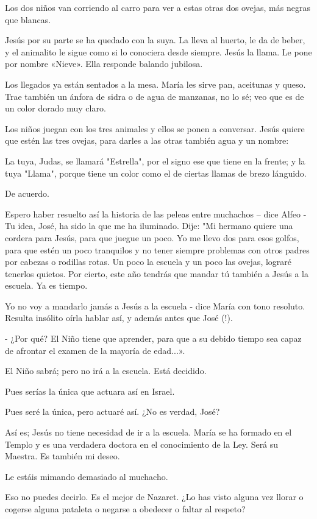 \documentclass[12pt]{book} %
\begin{document}
Los dos niños van corriendo al carro para ver a estas otras dos ovejas, más negras que blancas. 

Jesús por su parte se ha quedado con la suya. La lleva al huerto, le da de beber, y el animalito le sigue como si lo conociera desde siempre. Jesús la llama. Le pone por nombre «Nieve». Ella responde balando jubilosa. 

Los llegados ya están sentados a la mesa. María les sirve pan, aceitunas y queso. Trae también un ánfora de sidra o de agua de manzanas, no lo sé; veo que es de un color dorado muy claro. 

Los niños juegan con los tres animales y ellos se ponen a conversar. Jesús quiere que estén las tres ovejas, para darles a las otras también agua y un nombre: 

La tuya, Judas, se llamará "Estrella", por el signo ese que tiene en la frente; y la tuya "Llama", porque tiene un color como el de ciertas llamas de brezo lánguido. 

De acuerdo. 

Espero haber resuelto así la historia de las peleas entre muchachos – dice Alfeo - Tu idea, José, ha sido la que me ha iluminado. Dije: "Mi hermano quiere una cordera para Jesús, para que juegue un poco. Yo me llevo dos para esos golfos, para que estén un poco tranquilos y no tener siempre problemas con otros padres por cabezas o rodillas rotas. Un poco la escuela y un poco las ovejas, lograré tenerlos quietos. Por cierto, este año tendrás que mandar tú también a Jesús a la escuela. Ya es tiempo. 

Yo no voy a mandarlo jamás a Jesús a la escuela - dice María con tono resoluto. Resulta insólito oírla hablar así, y además antes que José (!). 

- ¿Por qué? El Niño tiene que aprender, para que a su debido tiempo sea capaz de afrontar el examen de la mayoría de edad...». 

El Niño sabrá; pero no irá a la escuela. Está decidido. 

Pues serías la única que actuara así en Israel. 

Pues seré la única, pero actuaré así. ¿No es verdad, José? 

Así es; Jesús no tiene necesidad de ir a la escuela. María se ha formado en el Templo y es una verdadera doctora en el conocimiento de la Ley. Será su Maestra. Es también mi deseo. 

Le estáis mimando demasiado al muchacho. 

Eso no puedes decirlo. Es el mejor de Nazaret. ¿Lo has visto alguna vez llorar o cogerse alguna pataleta o negarse a obedecer o faltar al respeto? 
\end{document}
